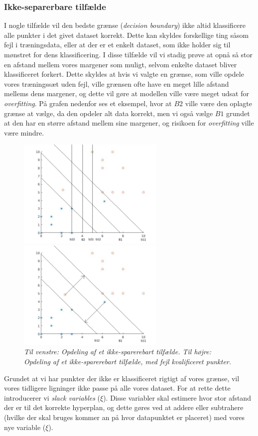 \documentclass{article}
\begin{document}
\subsubsection{Ikke-separerbare tilfælde}
I nogle tilfælde vil den bedste grænse (\textit{decision boundary}) ikke altid klassificere alle punkter i det givet dataset korrekt. Dette kan skyldes forskellige ting såsom fejl i træningsdata, eller at der er et enkelt dataset, som ikke holder sig til mønstret for dens klassificering. I disse tilfælde vil vi stadig prøve at opnå så stor en afstand mellem vores margener som muligt, selvom enkelte dataset bliver klassificeret forkert. Dette skyldes at hvis vi valgte en grænse, som ville opdele vores træningssæt uden fejl, ville grænsen ofte have en meget lille afstand mellems dens margener, og dette vil gøre at modellen ville være meget udsat for \textit{overfitting}. På grafen nedenfor ses et eksempel, hvor at $B2$ ville være den oplagte grænse at vælge, da den opdeler alt data korrekt, men vi også vælge $B1$ grundet at den har en større afstand mellem sine margener, og risikoen for \textit{overfitting} ville være mindre. 
\begin{figure}[H]
	\begin{minipage}[t]{0.6\linewidth}
		\includegraphics[width=7cm]{svm_plot_1}
	\end{minipage}
	\begin{minipage}[t]{0.1\linewidth}
		\includegraphics[width=7cm]{svm_plot_1_2}
	\end{minipage}
\caption{\textit{Til venstre: Opdeling af et ikke-sparerebart tilfælde. Til højre: Opdeling af et ikke-sparerebart tilfælde, med fejl kvalificeret punkter.}}
\label{fig:hyperplane_example_1}
\end{figure}
Grundet at vi har punkter der ikke er klassificeret rigtigt af vores grænse, vil vores tidligere ligninger ikke passe på alle vores dataset. For at rette dette introducerer vi \textit{slack variables} ($\xi$). Disse variabler skal estimere hvor stor afstand der er til det korrekte hyperplan, og dette gøres ved at addere eller subtrahere (hvilke der skal bruges kommer an på hvor datapunktet er placeret) med vores nye variable ($\xi$). 
\end{document}
